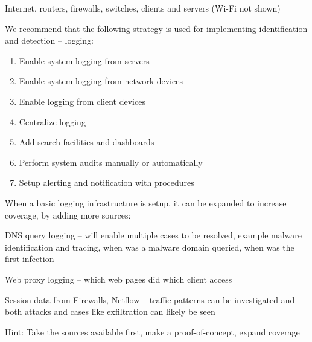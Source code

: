 \documentclass[Screen16to9,17pt]{foils}
\begin{document}
\begin{list2}
\item Internet, routers, firewalls, switches, clients and servers (Wi-Fi not shown)
\end{list2}



We recommend that the following strategy is used for implementing identification and detection -- logging:
\begin{enumerate}
\item[\faSquareO] Enable system logging from servers
\item[\faSquareO] Enable system logging from network devices
\item[\faSquareO] Enable logging from client devices
\item[\faSquareO] Centralize logging
\item[\faSquareO] Add search facilities and dashboards
\item[\faSquareO] Perform system audits manually or automatically
\item[\faSquareO] Setup alerting and notification with procedures
\end{enumerate}

When a basic logging infrastructure is setup, it can be expanded to increase coverage, by
adding more sources:

\begin{list2}
\item DNS query logging -- will enable multiple cases to be resolved, example malware identification and tracing, when was a malware domain queried, when was the first infection
\item Web proxy logging -- which web pages did which client access
\item Session data from Firewalls, Netflow -- traffic patterns can be investigated and both attacks and cases like exfiltration can likely be seen

\end{list2}

Hint: Take the sources available first, make a proof-of-concept, expand coverage







\begin{quote}

\end{quote}
\end{document}
